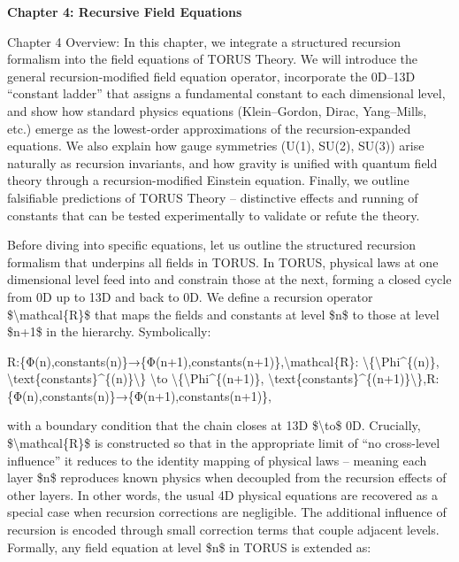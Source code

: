 \documentclass[]{article}
\date{}
\begin{document}
\textbf{Chapter 4: Recursive Field Equations}

Chapter 4 Overview: In this chapter, we integrate a structured recursion
formalism into the field equations of TORUS Theory. We will introduce
the general recursion-modified field equation operator, incorporate the
0D--13D ``constant ladder'' that assigns a fundamental constant to each
dimensional level, and show how standard physics equations
(Klein--Gordon, Dirac, Yang--Mills, etc.) emerge as the lowest-order
approximations of the recursion-expanded equations. We also explain how
gauge symmetries (U(1), SU(2), SU(3)) arise naturally as recursion
invariants, and how gravity is unified with quantum field theory through
a recursion-modified Einstein equation. Finally, we outline falsifiable
predictions of TORUS Theory -- distinctive effects and running of
constants that can be tested experimentally to validate or refute the
theory.

Before diving into specific equations, let us outline the structured
recursion formalism that underpins all fields in TORUS. In TORUS,
physical laws at one dimensional level feed into and constrain those at
the next, forming a closed cycle from 0D up to 13D and back to 0D. We
define a recursion operator \$\textbackslash{}mathcal\{R\}\$ that maps
the fields and constants at level \$n\$ to those at level \$n+1\$ in the
hierarchy. Symbolically:

R:\{Φ(n),constants(n)\}→\{Φ(n+1),constants(n+1)\},\textbackslash{}mathcal\{R\}:
\textbackslash{}\{\textbackslash{}Phi\^{}\{(n)\},
\textbackslash{}text\{constants\}\^{}\{(n)\}\textbackslash{}\}
\textbackslash{}to \textbackslash{}\{\textbackslash{}Phi\^{}\{(n+1)\},
\textbackslash{}text\{constants\}\^{}\{(n+1)\}\textbackslash{}\},R:\{Φ(n),constants(n)\}→\{Φ(n+1),constants(n+1)\},

with a boundary condition that the chain closes at 13D
\$\textbackslash{}to\$ 0D. Crucially, \$\textbackslash{}mathcal\{R\}\$
is constructed so that in the appropriate limit of ``no cross-level
influence'' it reduces to the identity mapping of physical laws --
meaning each layer \$n\$ reproduces known physics when decoupled from
the recursion effects of other layers. In other words, the usual 4D
physical equations are recovered as a special case when recursion
corrections are negligible. The additional influence of recursion is
encoded through small correction terms that couple adjacent levels.
Formally, any field equation at level \$n\$ in TORUS is extended as:
\end{document}
